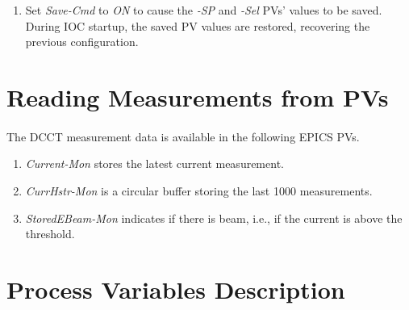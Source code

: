 \documentclass[openany]{article}
\begin{document}
			\begin{enumerate}
				\item Set \emph{Save-Cmd} to \emph{ON} to cause the \emph{-SP} and \emph{-Sel} PVs' values to be saved. During IOC startup, the saved PV values are restored, recovering the previous configuration.
			\end{enumerate}

\section{Reading Measurements from PVs}

	\paragraph{} The DCCT measurement data is available in the following EPICS PVs.

		\begin{enumerate}
			\item \emph{Current-Mon} stores the latest current measurement.
			\item \emph{CurrHstr-Mon} is a circular buffer storing the last 1000 measurements.
			\item \emph{StoredEBeam-Mon} indicates if there is beam, i.e., if the current is above the threshold.
		\end{enumerate}

\section{Process Variables Description}\label{sec:process-variables}
\end{document}
